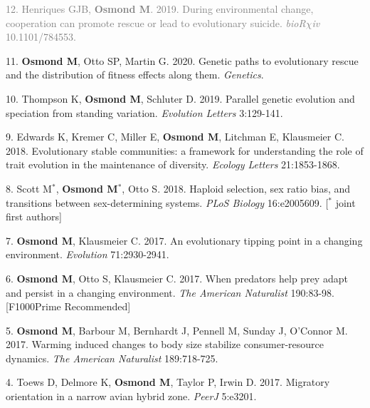 \documentclass[12pt]{article}
\begin{document}
\noindent\hspace{.1cm}\textcolor{gray}{12. Henriques GJB, \textbf{Osmond M}. 2019. During environmental change, cooperation can promote rescue or lead to evolutionary suicide. \textit{bioR$\chi$iv} 10.1101/784553.}

\noindent\hspace{.1cm}11. \textbf{Osmond M}, Otto SP, Martin G. 2020. Genetic paths to evolutionary rescue and the distribution of fitness effects along them. \textit{Genetics}.

\noindent\hspace{.1cm}10. Thompson K, \textbf{Osmond M}, Schluter D. 2019. Parallel genetic evolution and speciation from standing variation. \textit{Evolution Letters} 3:129-141.

\noindent\hspace{.1cm}9. Edwards K, Kremer C, Miller E, \textbf{Osmond M}, Litchman E, Klausmeier C. 2018. Evolutionary stable communities: a framework for understanding the role of trait evolution in the maintenance of diversity. \textit{Ecology Letters} 21:1853-1868.

\noindent\hspace{.1cm}8. Scott M$^*$, \textbf{Osmond M}$^*$, Otto S. 2018. Haploid selection, sex ratio bias, and transitions between sex-determining systems. \textit{PLoS Biology} 16:e2005609. [$^*$ joint first authors]

\noindent\hspace{.1cm}7. \textbf{Osmond M}, Klausmeier C. 2017. An evolutionary tipping point in a changing environment. \textit{Evolution} 71:2930-2941.

\noindent\hspace{.1cm}6. \textbf{Osmond M}, Otto S, Klausmeier C. 2017. When predators help prey adapt and persist in a changing environment. \textit{The American Naturalist} 190:83-98. [F1000Prime Recommended]

\noindent\hspace{.1cm}5. \textbf{Osmond M}, Barbour M, Bernhardt J, Pennell M, Sunday J, O'Connor M. 2017. Warming induced changes to body size stabilize consumer-resource dynamics. \textit{The American Naturalist} 189:718-725.

\noindent\hspace{.1cm}4. Toews D, Delmore K, \textbf{Osmond M}, Taylor P, Irwin D. 2017. Migratory orientation in a narrow avian hybrid zone. \textit{PeerJ} 5:e3201.
\end{document}

